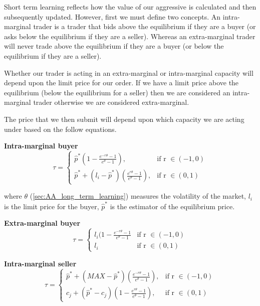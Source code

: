 \documentclass{acm_proc_article-sp}
\begin{document}
Short term learning reflects how the value of our aggressive is calculated and
then subsequently updated. However, first we must define two concepts. An
intra-marginal trader is a trader that bids above the equilibrium if they are a
buyer (or asks below the equilibrium if they are a seller). Whereas an
extra-marginal trader will never trade above the equilibrium if they are a
buyer (or below the equilibrium if they are a seller).

Whether our trader is acting in an extra-marginal or intra-marginal capacity
will depend upon the limit price for our order. If we have a limit price above
the equilibrium (below the equilibrium for a seller) then we are considered an
intra-marginal trader otherwise we are considered extra-marginal.

The price that we then submit will depend upon which capacity we are acting
under based on the follow equations.

\textbf{Intra-marginal buyer}
\begin{equation}
\tau =
\begin{cases}
      \hat{p}^*(1- \frac{e^{-r\theta}-1}{e^{\theta}-1}), &  \text{if r } \in (-1,0)  \\
      \hat{p}^* + (l_i-\hat{p}^*)(\frac{e^{r\theta}-1}{e^\theta-1}), & \text{if
      r } \in (0,1)
\end{cases}
\label{intrabuyer}
\end{equation}

where $\theta$ (\ref{sec:AA_long_term_learning}) measures the volatility of the
market, $l_i$ is the limit price for the buyer, $\hat{p}^*$ is the estimator of the
equilibrium price.

\textbf{Extra-marginal buyer}
\begin{equation}
\tau =
\begin{cases}
      l_i(1-\frac{e^{-r\theta}-1}{e^\theta-1} &  \text{if r } \in (-1,0)  \\
      l_i & \text{if r } \in (0,1)
\end{cases}
\label{extrabuyer}
\end{equation}

\textbf{Intra-marginal seller}
\begin{equation}
\label{intraseller}
\tau =
\begin{cases}
      \hat{p}^* + (MAX-\hat{p}^*)( \frac{e^{-r\theta}-1}{e^{\theta}-1}), &  \text{if r } \in (-1,0)  \\
      c_j + (\hat{p}^*-c_j)(1-\frac{e^{r\theta}-1}{e^\theta-1}), & \text{if r } \in (0,1)
\end{cases}
\end{equation}
\end{document}
